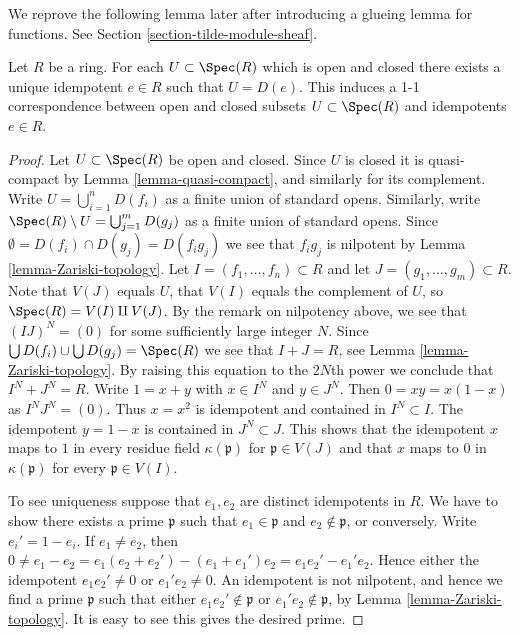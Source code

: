 \noindent
We reprove the following lemma later after introducing
a glueing lemma for functions. See Section
\ref{section-tilde-module-sheaf}.

\begin{lemma}
\label{lemma-disjoint-decomposition}
Let $R$ be a ring. For each $U \subset \Spec(R)$
which is open and closed
there exists a unique idempotent $e \in R$ such that
$U = D(e)$. This induces a 1-1 correspondence between
open and closed subsets $U \subset \Spec(R)$ and
idempotents $e \in R$.
\end{lemma}

\begin{proof}
Let $U \subset \Spec(R)$ be open and closed.
Since $U$ is closed it is quasi-compact by
Lemma \ref{lemma-quasi-compact}, and similarly for
its complement.
Write $U = \bigcup_{i = 1}^n D(f_i)$ as a finite union of standard opens.
Similarly, write $\Spec(R) \setminus U = \bigcup_{j = 1}^m D(g_j)$
as a finite union of standard opens. Since $\emptyset =
D(f_i) \cap D(g_j) = D(f_i g_j)$ we see that $f_i g_j$ is
nilpotent by Lemma \ref{lemma-Zariski-topology}.
Let $I = (f_1, \ldots, f_n) \subset R$ and let
$J = (g_1, \ldots, g_m) \subset R$.
Note that $V(J)$ equals $U$, that $V(I)$
equals the complement of $U$, so $\Spec(R) = V(I) \amalg V(J)$.
By the remark on nilpotency above,
we see that $(IJ)^N = (0)$ for some sufficiently large integer $N$.
Since $\bigcup D(f_i) \cup \bigcup D(g_j) = \Spec(R)$
we see that $I + J = R$, see Lemma \ref{lemma-Zariski-topology}.
By raising this equation to the $2N$th power we conclude that
$I^N + J^N = R$. Write $1 = x + y$ with $x \in I^N$ and $y \in J^N$.
Then $0 = xy = x(1 - x)$ as $I^N J^N = (0)$. Thus $x = x^2$
is idempotent and contained
in $I^N \subset I$. The idempotent $y = 1 - x$ is contained in $J^N \subset J$. 
This shows that the idempotent $x$ maps to $1$ in every residue field
$\kappa(\mathfrak p)$ for $\mathfrak p \in V(J)$ and that $x$ maps to $0$
in $\kappa(\mathfrak p)$ for every $\mathfrak p \in V(I)$.

\medskip\noindent
To see uniqueness suppose that $e_1, e_2$ are
distinct idempotents in $R$. We have to show there
exists a prime $\mathfrak p$ such that $e_1 \in \mathfrak p$
and $e_2 \not \in \mathfrak p$, or conversely.
Write $e_i' = 1 - e_i$. If $e_1 \not = e_2$, then
$0 \not = e_1 - e_2  = e_1(e_2 + e_2') - (e_1 + e_1')e_2
= e_1 e_2' - e_1' e_2$. Hence either the idempotent
$e_1 e_2' \not = 0$ or $e_1' e_2 \not = 0$. An idempotent
is not nilpotent, and hence we find a prime
$\mathfrak p$ such that either $e_1e_2' \not \in \mathfrak p$
or $e_1'e_2 \not \in \mathfrak p$, by Lemma \ref{lemma-Zariski-topology}.
It is easy to see this gives the desired prime.
\end{proof}

